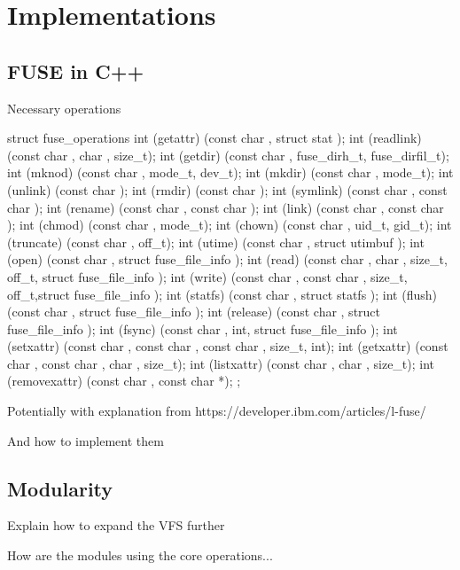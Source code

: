 \chapter{Implementations}

\section{FUSE in C++}

Necessary operations

struct fuse_operations {
    int (getattr) (const char , struct stat );
    int (readlink) (const char , char , size_t);
    int (getdir) (const char , fuse_dirh_t, fuse_dirfil_t);
    int (mknod) (const char , mode_t, dev_t);
    int (mkdir) (const char , mode_t);
    int (unlink) (const char );
    int (rmdir) (const char );
    int (symlink) (const char , const char );
    int (rename) (const char , const char );
    int (link) (const char , const char );
    int (chmod) (const char , mode_t);
    int (chown) (const char , uid_t, gid_t);
    int (truncate) (const char , off_t);
    int (utime) (const char , struct utimbuf );
    int (open) (const char , struct fuse_file_info );
    int (read) (const char , char , size_t, off_t, struct fuse_file_info );
    int (write) (const char , const char , size_t, off_t,struct fuse_file_info );
    int (statfs) (const char , struct statfs );
    int (flush) (const char , struct fuse_file_info );
    int (release) (const char , struct fuse_file_info );
    int (fsync) (const char , int, struct fuse_file_info );
    int (setxattr) (const char , const char , const char , size_t, int);
    int (getxattr) (const char , const char , char , size_t);
    int (listxattr) (const char , char , size_t);
    int (removexattr) (const char , const char *);
};

Potentially with explanation from https://developer.ibm.com/articles/l-fuse/

And how to implement them

\section{Modularity}

Explain how to expand the VFS further

How are the modules using the core operations...